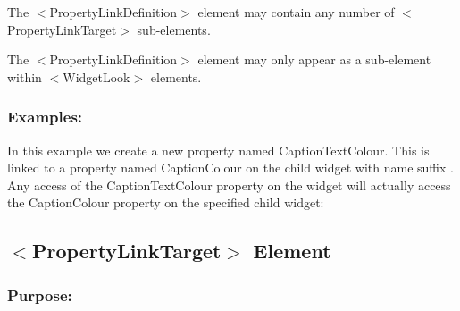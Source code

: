 \begin{DoxyItemize}
\item The {\ttfamily $<$Property\+Link\+Definition$>$} element may contain any number of {\ttfamily $<$Property\+Link\+Target$>$} sub-\/elements. 
\item The {\ttfamily $<$Property\+Link\+Definition$>$} element may only appear as a sub-\/element within {\ttfamily $<$Widget\+Look$>$} elements. 
\end{DoxyItemize}\hypertarget{fal_element_ref_fal_elem_ref_sec_27_4}{}\subsubsection{Examples\+:}\label{fal_element_ref_fal_elem_ref_sec_27_4}
In this example we create a new property named \textquotesingle{}Caption\+Text\+Colour\textquotesingle{}. This is linked to a property named \textquotesingle{}Caption\+Colour\textquotesingle{} on the child widget with name suffix \textquotesingle{}. Any access of the \textquotesingle{}Caption\+Text\+Colour\textquotesingle{} property on the widget will actually access the \textquotesingle{}Caption\+Colour\textquotesingle{} property on the specified child widget\+: 
\begin{DoxyCode}{0}
\DoxyCodeLine{  />}
\end{DoxyCode}
\hypertarget{fal_element_ref_fal_elem_propertylinktarget}{}\subsection{$<$\+Property\+Link\+Target$>$ Element}\label{fal_element_ref_fal_elem_propertylinktarget}
\hypertarget{fal_element_ref_fal_elem_propertylinktargetr_1}{}\subsubsection{Purpose\+:}\label{fal_element_ref_fal_elem_propertylinktargetr_1}
